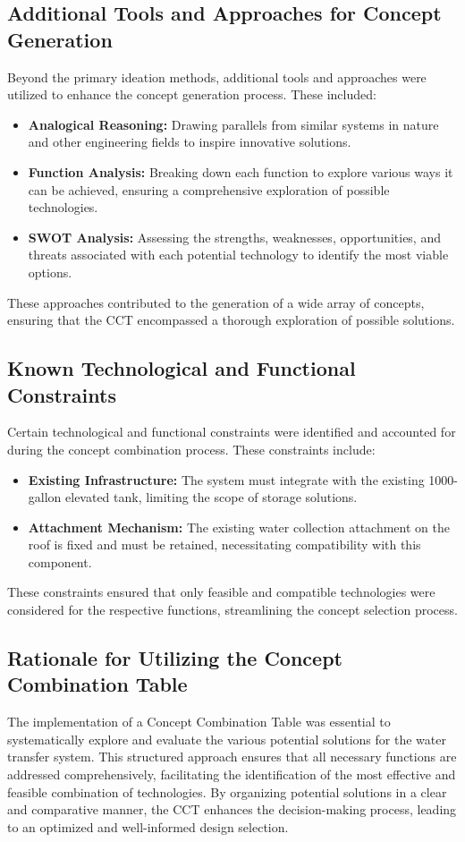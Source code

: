 \documentclass[12pt]{report}
\begin{document}
\subsection{Additional Tools and Approaches for Concept Generation}
Beyond the primary ideation methods, additional tools and approaches were utilized to enhance the concept generation process. These included:

\begin{itemize}
    \item \textbf{Analogical Reasoning:} Drawing parallels from similar systems in nature and other engineering fields to inspire innovative solutions.
    \item \textbf{Function Analysis:} Breaking down each function to explore various ways it can be achieved, ensuring a comprehensive exploration of possible technologies.
    \item \textbf{SWOT Analysis:} Assessing the strengths, weaknesses, opportunities, and threats associated with each potential technology to identify the most viable options.
\end{itemize}

These approaches contributed to the generation of a wide array of concepts, ensuring that the CCT encompassed a thorough exploration of possible solutions.

\subsection{Known Technological and Functional Constraints}
Certain technological and functional constraints were identified and accounted for during the concept combination process. These constraints include:

\begin{itemize}
    \item \textbf{Existing Infrastructure:} The system must integrate with the existing 1000-gallon elevated tank, limiting the scope of storage solutions.
    \item \textbf{Attachment Mechanism:} The existing water collection attachment on the roof is fixed and must be retained, necessitating compatibility with this component.
\end{itemize}

These constraints ensured that only feasible and compatible technologies were considered for the respective functions, streamlining the concept selection process.

\subsection{Rationale for Utilizing the Concept Combination Table}
The implementation of a Concept Combination Table was essential to systematically explore and evaluate the various potential solutions for the water transfer system. This structured approach ensures that all necessary functions are addressed comprehensively, facilitating the identification of the most effective and feasible combination of technologies. By organizing potential solutions in a clear and comparative manner, the CCT enhances the decision-making process, leading to an optimized and well-informed design selection.
\end{document}
